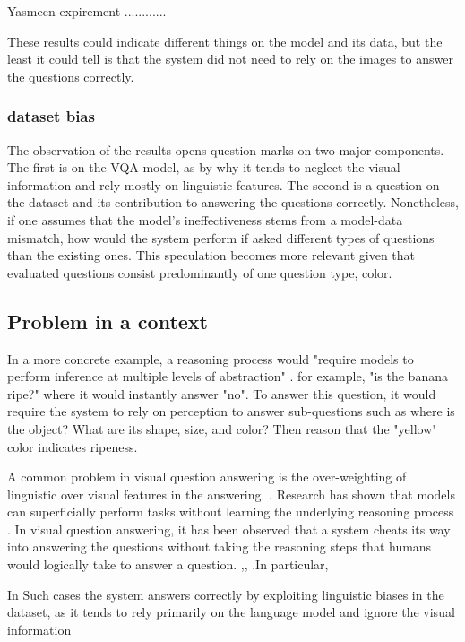  Yasmeen expirement {............}
 
 These results could indicate different things on the model and its data, but the least it could tell is that the system did not need to rely on the images to answer the questions correctly.

\subsubsection{dataset bias}
The observation of the results opens question-marks on two major components. The first is on the VQA model, as by why it tends to neglect the visual information and rely mostly on linguistic features. The second is a question on the dataset and its contribution to answering the questions correctly. Nonetheless, if one assumes that the model's ineffectiveness stems from a model-data mismatch, how would the system perform if asked different types of questions than the existing ones. This speculation becomes more relevant given that evaluated questions consist predominantly of one question type, color.



\subsection{Problem in a context}


In a more concrete example, a reasoning process would "require models to perform inference at multiple levels of abstraction" \cite{selvaraju2020squinting}. for example, "is the banana ripe?" where it would instantly answer "no".  To answer this question, it would require the system to rely on perception to answer sub-questions such as where is the object? What are its shape, size, and color? Then reason that the "yellow" color indicates ripeness.


A common problem in visual question answering is the over-weighting of linguistic over visual features in the answering. \cite{fukui2016multimodal}. Research has shown that models can superficially perform tasks without learning the underlying reasoning process \cite{turmsimple}. In visual question answering, it has been observed that a system cheats its way into answering the questions without taking the reasoning steps that humans would logically take to answer a question. \cite{agrawal2016analyzing},\cite{zhang2016yin}, \cite {fukui2016multimodal}.In particular, 

In Such cases the system answers correctly by exploiting linguistic biases in the dataset, as it tends to rely primarily on the language model and ignore the visual information \cite {goyal2017making}

